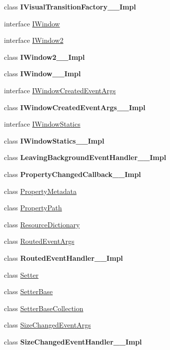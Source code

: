 \begin{DoxyCompactItemize}
\item 
class {\bfseries I\+Visual\+Transition\+Factory\+\_\+\+\_\+\+Impl}
\item 
interface \hyperlink{interface_windows_1_1_u_i_1_1_xaml_1_1_i_window}{I\+Window}
\item 
interface \hyperlink{interface_windows_1_1_u_i_1_1_xaml_1_1_i_window2}{I\+Window2}
\item 
class {\bfseries I\+Window2\+\_\+\+\_\+\+Impl}
\item 
class {\bfseries I\+Window\+\_\+\+\_\+\+Impl}
\item 
interface \hyperlink{interface_windows_1_1_u_i_1_1_xaml_1_1_i_window_created_event_args}{I\+Window\+Created\+Event\+Args}
\item 
class {\bfseries I\+Window\+Created\+Event\+Args\+\_\+\+\_\+\+Impl}
\item 
interface \hyperlink{interface_windows_1_1_u_i_1_1_xaml_1_1_i_window_statics}{I\+Window\+Statics}
\item 
class {\bfseries I\+Window\+Statics\+\_\+\+\_\+\+Impl}
\item 
class {\bfseries Leaving\+Background\+Event\+Handler\+\_\+\+\_\+\+Impl}
\item 
class {\bfseries Property\+Changed\+Callback\+\_\+\+\_\+\+Impl}
\item 
class \hyperlink{class_windows_1_1_u_i_1_1_xaml_1_1_property_metadata}{Property\+Metadata}
\item 
class \hyperlink{class_windows_1_1_u_i_1_1_xaml_1_1_property_path}{Property\+Path}
\item 
class \hyperlink{class_windows_1_1_u_i_1_1_xaml_1_1_resource_dictionary}{Resource\+Dictionary}
\item 
class \hyperlink{class_windows_1_1_u_i_1_1_xaml_1_1_routed_event_args}{Routed\+Event\+Args}
\item 
class {\bfseries Routed\+Event\+Handler\+\_\+\+\_\+\+Impl}
\item 
class \hyperlink{class_windows_1_1_u_i_1_1_xaml_1_1_setter}{Setter}
\item 
class \hyperlink{class_windows_1_1_u_i_1_1_xaml_1_1_setter_base}{Setter\+Base}
\item 
class \hyperlink{class_windows_1_1_u_i_1_1_xaml_1_1_setter_base_collection}{Setter\+Base\+Collection}
\item 
class \hyperlink{class_windows_1_1_u_i_1_1_xaml_1_1_size_changed_event_args}{Size\+Changed\+Event\+Args}
\item 
class {\bfseries Size\+Changed\+Event\+Handler\+\_\+\+\_\+\+Impl}

\end{DoxyCompactItemize}
